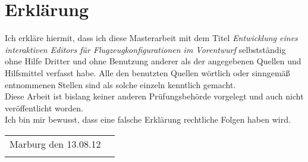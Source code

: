 \chapter*{Erkl\"arung}
\thispagestyle{empty}

\normalsize
Ich erkl\"are hiermit, dass ich diese Masterarbeit mit dem Titel \textit{Entwicklung eines interaktiven Editors f\"ur Flugzeugkonfigurationen im Vorentwurf} selbstst\"andig ohne Hilfe Dritter und ohne Benutzung anderer als der angegebenen Quellen und Hilfsmittel verfasst habe. Alle den benutzten Quellen w\"ortlich oder sinngem\"a\ss {} entnommenen Stellen sind als solche einzeln kenntlich gemacht.\\

\noindent Diese Arbeit ist bislang keiner anderen Pr\"ufungsbeh\"orde vorgelegt und auch nicht ver\"offentlicht worden.\\

\noindent Ich bin mir bewusst, dass eine falsche Erkl\"arung rechtliche Folgen haben wird.\\[3cm]

 
\vspace{5em}
 
\begin{flushright}
\begin{table}[ht]
\begin{tabularx}{\textwidth}{Xp{7cm}}
Marburg den 13.08.12 & \tabularnewline \cline{2-2}  \addlinespace
 & \centering{Ren\'{e} Frank}
\end{tabularx}
\end{table}
\end{flushright}
